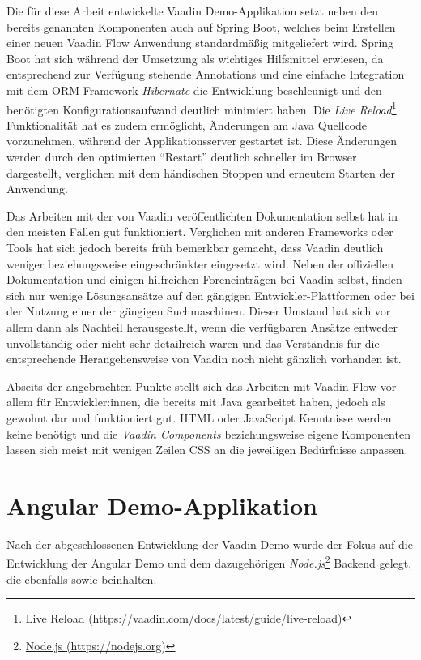 \documentclass[a4paper,12pt,twoside]{scrreprt}
\begin{document}
Die für diese Arbeit entwickelte Vaadin Demo-Applikation setzt neben den bereits genannten Komponenten auch auf Spring Boot, welches beim Erstellen einer neuen Vaadin Flow Anwendung standardmäßig mitgeliefert wird. Spring Boot hat sich während der Umsetzung als wichtiges Hilfsmittel erwiesen, da entsprechend zur Verfügung stehende Annotations und eine einfache Integration mit dem ORM-Framework \textit{Hibernate} die Entwicklung beschleunigt und den benötigten Konfigurationsaufwand deutlich minimiert haben. Die \textit{Live Reload}\footnote{\href{https://vaadin.com/docs/latest/guide/live-reload}{Live Reload (https://vaadin.com/docs/latest/guide/live-reload)}} Funktionalität hat es zudem ermöglicht, Änderungen am Java Quellcode vorzunehmen, während der Applikationsserver gestartet ist. Diese Änderungen werden durch den optimierten \enquote{Restart} deutlich schneller im Browser dargestellt, verglichen mit dem händischen Stoppen und erneutem Starten der Anwendung.

\medskip

Das Arbeiten mit der von Vaadin veröffentlichten Dokumentation selbst hat in den meisten Fällen gut funktioniert. Verglichen mit anderen Frameworks oder Tools hat sich jedoch bereits früh bemerkbar gemacht, dass Vaadin deutlich weniger beziehungsweise eingeschränkter eingesetzt wird. Neben der offiziellen Dokumentation und einigen hilfreichen Foreneinträgen bei Vaadin selbst, finden sich nur wenige Lösungsansätze auf den gängigen Entwickler-Plattformen oder bei der Nutzung einer der gängigen Suchmaschinen. Dieser Umstand hat sich vor allem dann als Nachteil herausgestellt, wenn die verfügbaren Ansätze entweder unvollständig oder nicht sehr detailreich waren und das Verständnis für die entsprechende Herangehensweise von Vaadin noch nicht gänzlich vorhanden ist.

\medskip

Abseits der angebrachten Punkte stellt sich das Arbeiten mit Vaadin Flow vor allem für Entwickler:innen, die bereits mit Java gearbeitet haben, jedoch als gewohnt dar und funktioniert gut. HTML oder JavaScript Kenntnisse werden keine benötigt und die \textit{Vaadin Components} beziehungsweise eigene Komponenten lassen sich meist mit wenigen Zeilen \ac{CSS} an die jeweiligen Bedürfnisse anpassen.

\section{Angular Demo-Applikation}
\label{sec:angular-demo}
Nach der abgeschlossenen Entwicklung der Vaadin Demo wurde der Fokus auf die Entwicklung der Angular Demo und dem dazugehörigen \textit{Node.js}\footnote{\href{https://https://nodejs.org/}{Node.js (https://nodejs.org)}} Backend gelegt, die ebenfalls \textit{} sowie \textit{} beinhalten.
\end{document}
